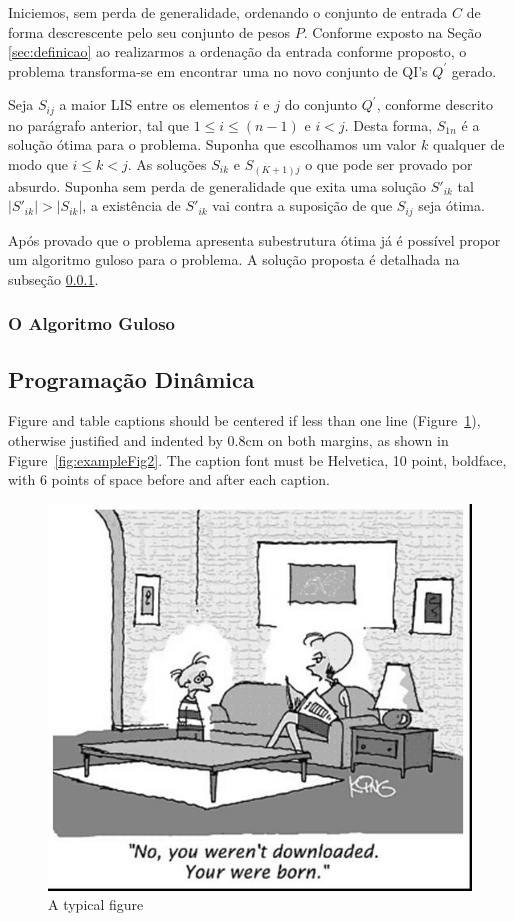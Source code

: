 \documentclass[12pt]{article}
\begin{document}
Iniciemos, sem perda de generalidade, ordenando o conjunto de entrada $C$ de forma descrescente pelo seu conjunto de pesos $P$. Conforme exposto na Seção \ref{sec:definicao} ao realizarmos a ordenação da entrada conforme proposto, o problema transforma-se em encontrar uma  no novo conjunto de QI's $Q^{'}$ gerado.

Seja $S_{ij}$ a maior LIS entre os elementos $i$ e $j$ do conjunto  $Q^{'}$, conforme descrito no parágrafo anterior, tal que $1 \leq i \leq (n-1)$ e $i < j$. Desta forma, $S_{1n}$ é a solução ótima para o problema. Suponha que escolhamos um valor $k$ qualquer de modo que $ i \leq k < j$. As soluções $S_{ik}$ e $S_{(K+1)j}$  o que pode ser provado por absurdo. Suponha sem perda de generalidade que exita uma solução $S'_{ik}$ tal $|S'_{ik}| > |S_{ik}|$, a existência de $S'_{ik}$ vai contra a suposição de que $S_{ij}$ seja ótima.

Após provado que o problema apresenta subestrutura ótima já é possível propor um algoritmo guloso para o problema. A solução proposta é detalhada na subseção \ref{subsubsec:alg_guloso}.

\subsubsection{O Algoritmo Guloso}
\label{subsubsec:alg_guloso}

\subsection{Programação Dinâmica}
\label{subsec:pd}


Figure and table captions should be centered if less than one line
(Figure~\ref{fig:exampleFig1}), otherwise justified and indented by 0.8cm on
both margins, as shown in Figure~\ref{fig:exampleFig2}. The caption font must
be Helvetica, 10 point, boldface, with 6 points of space before and after each
caption.

\begin{figure}[ht]
\centering
\includegraphics[width=.5\textwidth]{fig1.jpg}
\caption{A typical figure}
\label{fig:exampleFig1}
\end{figure}
\end{document}
